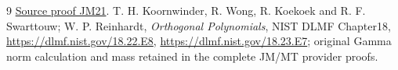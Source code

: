 \documentclass[11pt]{article}
\begin{document}
\begin{thebibliography}{9}
\href{https://github.com/KokunoYumeto/zeta-function-research-reader/blob/5992ad50c0f2a06921f1fcaded7b4e38097c0739/workbenches/splitzero-tandem/continuations/20260920-original-kernel-mixed-determinants/providers/JOINT_MINIMUM_RECEIVERS.tex\#L286}{Source proof JM21}.
 T. H. Koornwinder, R. Wong, R. Koekoek and R. F. Swarttouw;
W. P. Reinhardt, \emph{Orthogonal Polynomials}, NIST DLMF Chapter18,
\url{https://dlmf.nist.gov/18.22.E8},
\url{https://dlmf.nist.gov/18.23.E7}; original Gamma norm calculation
and mass retained in the complete JM/MT provider proofs.
\end{thebibliography}
\end{document}
